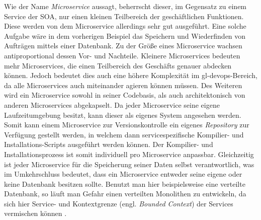     Wie der Name \emph{Microservice} aussagt, beherrscht dieser, im Gegensatz zu einem Service der SOA, nur einen kleinen Teilbereich der geschäftlichen Funktionen. Diese werden von dem Microservice allerdings sehr gut ausgeführt. Eine solche Aufgabe wäre in dem vorherigen Beispiel das Speichern und Wiederfinden von Aufträgen mittels einer Datenbank. Zu der Größe eines Microservice wachsen antiproportional dessen Vor- und Nachteile. Kleinere Microservices bedeuten mehr Microservices, die einen Teilbereich des Geschäfts genauer abdecken können. Jedoch bedeutet dies auch eine höhere Komplexität im \gls{gl-devops}-Bereich, da alle Microservices auch miteinander agieren können müssen. Des Weiteren wird ein Microservice sowohl in seiner Codebasis, als auch architektonisch von anderen Microservices abgekapselt. Da jeder Microservice seine eigene Laufzeitumgebung besitzt, kann dieser als eigenes System angesehen werden. Somit kann einem Microservice zur Versionskontrolle ein eigenes \emph{Repository} zur Verfügung gestellt werden, in welchem dann servicespezifische Kompilier- und Installations-Scripts ausgeführt werden können. Der Kompilier- und Installationsprozess ist somit individuell pro Microservice anpassbar. Gleichzeitig ist jeder Microservice für die Speicherung seiner Daten selbst verantwortlich, was im Umkehrschluss bedeutet, dass ein Microservice entweder seine eigene oder keine Datenbank besitzen sollte. Benutzt man hier beispielsweise eine verteilte Datenbank, so läuft man Gefahr einen verteilten Monolithen zu entwickeln, da sich hier Service- und Kontextgrenze (engl. \emph{Bounded Context}) der Services vermischen können \parencites[S. 22--23]{gallipeau2018microservices}{fowlerlewis2014microservices}.
    
